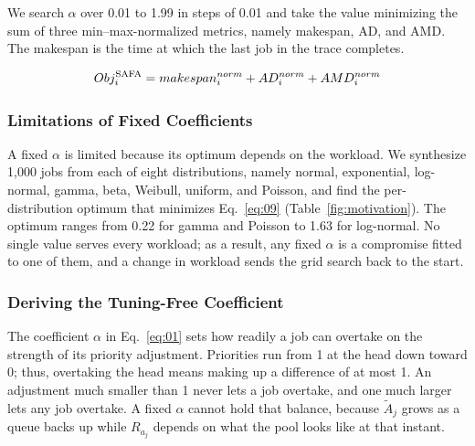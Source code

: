 \documentclass{ieeetj}
\begin{document}
We search $\alpha$ over 0.01 to 1.99 in steps of 0.01 and take the value minimizing the sum of three min--max-normalized metrics, namely makespan, AD, and AMD. The makespan is the time at which the last job in the trace completes. 

\begin{equation}
Obj_i^{\text{SAFA}} = makespan_i^{norm} + AD_i^{norm} + AMD_i^{norm}
\label{eq:09}
\vspace{2pt}
\end{equation}

\subsubsection{Limitations of Fixed Coefficients}\label{coeff:limit}
A fixed $\alpha$ is limited because its optimum depends on the workload. We synthesize 1,000 jobs from each of eight distributions, namely normal, exponential, log-normal, gamma, beta, Weibull, uniform, and Poisson, and find the per-distribution optimum that minimizes Eq.~\eqref{eq:09} (Table~\ref{fig:motivation}). The optimum ranges from 0.22 for gamma and Poisson to 1.63 for log-normal. No single value serves every workload; as a result, any fixed $\alpha$ is a compromise fitted to one of them, and a change in workload sends the grid search back to the start.

\begin{table}[htb!]
\centering
\caption{Optimal $\alpha$ by distribution}
\label{fig:motivation}
\footnotesize
\setlength{\tabcolsep}{4pt}
\end{table}

\subsubsection{Deriving the Tuning-Free Coefficient} \label{alphaeff}
The coefficient $\alpha$ in Eq.~\eqref{eq:01} sets how readily a job can overtake on the strength of its priority adjustment. Priorities run from 1 at the head down toward 0; thus, overtaking the head means making up a difference of at most 1. An adjustment much smaller than 1 never lets a job overtake, and one much larger lets any job overtake. A fixed $\alpha$ cannot hold that balance, because $\tilde A_j$ grows as a queue backs up while $R_{a_j}$ depends on what the pool looks like at that instant.
\end{document}
